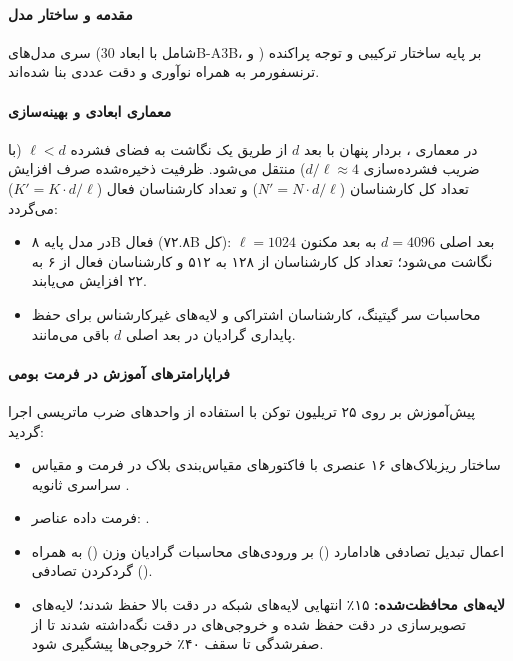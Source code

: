 \item {}

\paragraph*{مقدمه و ساختار مدل}
سری مدل‌های  \cite{nvidia2025nemotron3} (شامل  با ابعاد 30B-A3B،  و ) بر پایه ساختار ترکیبی  و توجه پراکنده ترنسفورمر به همراه نوآوری  و دقت عددی  بنا شده‌اند.

\paragraph*{معماری ابعادی و بهینه‌سازی }
در معماری ، بردار پنهان با بعد $d$ از طریق یک نگاشت به فضای فشرده $\ell < d$ (با ضریب فشرده‌سازی $d/\ell \approx 4$) منتقل می‌شود. ظرفیت ذخیره‌شده صرف افزایش تعداد کل کارشناسان ($N' = N \cdot d/\ell$) و تعداد کارشناسان فعال ($K' = K \cdot d/\ell$) می‌گردد:
\begin{itemize}
    \item در مدل پایه ۸B فعال (۷۲.۸B کل): بعد اصلی $d=4096$ به بعد مکنون $\ell=1024$ نگاشت می‌شود؛ تعداد کل کارشناسان از ۱۲۸ به ۵۱۲ و کارشناسان فعال از ۶ به ۲۲ افزایش می‌یابند.
    \item محاسبات سر گیتینگ، کارشناسان اشتراکی و لایه‌های غیرکارشناس برای حفظ پایداری گرادیان در بعد اصلی $d$ باقی می‌مانند.
\end{itemize}

\paragraph*{فراپارامترهای آموزش در فرمت بومی }
پیش‌آموزش بر روی ۲۵ تریلیون توکن با استفاده از واحدهای ضرب ماتریسی  اجرا گردید:
\begin{itemize}
    \item ساختار ریزبلاک‌های ۱۶ عنصری با فاکتورهای مقیاس‌بندی بلاک در فرمت  و مقیاس سراسری ثانویه .
    \item فرمت داده عناصر: .
    \item اعمال تبدیل تصادفی هادامارد () بر ورودی‌های محاسبات گرادیان وزن () به همراه گردکردن تصادفی ().
    \item \textbf{لایه‌های محافظت‌شده:} ۱۵٪ انتهایی لایه‌های شبکه در دقت بالا حفظ شدند؛ لایه‌های تصویرسازی  در دقت  حفظ شده و خروجی‌های  در دقت  نگه‌داشته شدند تا از صفرشدگی تا سقف ۴۰٪ خروجی‌ها پیشگیری شود.
\end{itemize}

